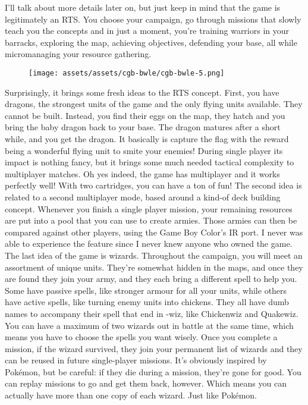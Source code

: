 \documentclass{book}
\begin{document}
I’ll talk about more details later on, but just keep in mind that the game is legitimately an RTS. You choose your campaign, go through missions that slowly teach you the concepts and in just a moment, you’re training warriors in your barracks, exploring the map, achieving objectives, defending your base, all while micromanaging your resource gathering.

\begin{figure}[hbt]
\vskip 10pt
\centering \texttt{[image: assets/assets/cgb-bwle/cgb-bwle-5.png]}
\vskip 6pt
\end{figure}

Surprisingly, it brings some fresh ideas to the RTS concept. First, you have dragons, the strongest units of the game and the only flying units available. They cannot be built. Instead, you find their eggs on the map, they hatch and you bring the baby dragon back to your base. The dragon matures after a short while, and you get the dragon. It basically is capture the flag with the reward being a wonderful flying unit to smite your enemies! During single player its impact is nothing fancy, but it brings some much needed tactical complexity to multiplayer matches. Oh yes indeed, the game has multiplayer and it works perfectly well! With two cartridges, you can have a ton of fun! The second idea is related to a second multiplayer mode, based around a kind-of deck building concept. Whenever you finish a single player mission, your remaining resources are put into a pool that you can use to create armies. Those armies can then be compared against other players, using the Game Boy Color’s IR port. I never was able to experience the feature since I never knew anyone who owned the game. The last idea of the game is wizards. Throughout the campaign, you will meet an assortment of unique units. They’re somewhat hidden in the maps, and once they are found they join your army, and they each bring a different spell to help you. Some have passive spells, like stronger armour for all your units, while others have active spells, like turning enemy units into chickens. They all have dumb names to accompany their spell that end in -wiz, like Chickenwiz and Quakewiz. You can have a maximum of two wizards out in battle at the same time, which means you have to choose the spells you want wisely. Once you complete a mission, if the wizard survived, they join your permanent list of wizards and they can be reused in future single-player missions. It’s obviously inspired by Pokémon, but be careful: if they die during a mission, they’re gone for good. You can replay missions to go and get them back, however. Which means you can actually have more than one copy of each wizard. Just like Pokémon.
\end{document}
